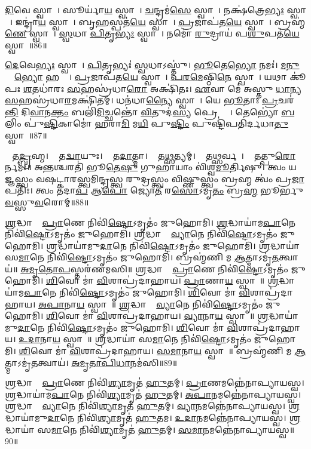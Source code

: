 \ul{𑌦𑌿}𑌵𑍇 𑌸𑍍𑌵𑌾𑌹𑌾᳚। 
𑌸𑍂𑌰𑍍𑌯𑌾॑\ul{𑌯} 𑌸𑍍𑌵𑌾𑌹𑌾᳚। 
\ul{𑌚}𑌨𑍍𑌦𑍍𑌰𑌮॑\ul{𑌸𑍇} 𑌸𑍍𑌵𑌾𑌹𑌾᳚। 
𑌨𑌕𑍍𑌷॑𑌤𑍍𑌰𑍇\ul{𑌭𑍍𑌯𑌃} 𑌸𑍍𑌵𑌾𑌹𑌾᳚। 
𑌇𑌨𑍍𑌦𑍍𑌰𑌾॑\ul{𑌯} 𑌸𑍍𑌵𑌾𑌹𑌾᳚। 
𑌬𑍃\ul{𑌹}𑌸𑍍𑌪𑌤॑\ul{𑌯𑍇} 𑌸𑍍𑌵𑌾𑌹𑌾᳚। 
\ul{𑌪𑍍𑌰}𑌜𑌾𑌪॑𑌤\ul{𑌯𑍇} 𑌸𑍍𑌵𑌾𑌹𑌾᳚। 
𑌬𑍍𑌰𑌹𑍍𑌮॑\ul{𑌣𑍇} 𑌸𑍍𑌵𑌾𑌹𑌾᳚। 
\ul{𑌸𑍍𑌵}𑌧𑌾 \ul{𑌪𑌿}𑌤𑍃\ul{𑌭𑍍𑌯𑌃} 𑌸𑍍𑌵𑌾𑌹𑌾᳚। 
𑌨𑌮𑍋॑ \ul{𑌰𑍁}𑌦𑍍𑌰𑌾𑌯॑ 𑌪\ul{𑌶𑍁}𑌪𑌤॑\ul{𑌯𑍇} 𑌸𑍍𑌵𑌾𑌹𑌾᳚॥86॥

\ul{𑌦𑍇}𑌵𑍇\ul{𑌭𑍍𑌯𑌃} 𑌸𑍍𑌵𑌾𑌹𑌾᳚। 
\ul{𑌪𑌿}𑌤𑍃𑌭𑍍𑌯𑌃॑ \ul{𑌸𑍍𑌵}𑌧𑌾𑌽𑌸𑍍𑌤𑍁॑। 
\ul{𑌭𑍂}𑌤𑍇\ul{𑌭𑍍𑌯𑍋} 𑌨𑌮𑌃॑। 
\ul{𑌮}\ul{𑌨𑍁}𑌷𑍍𑌯𑍇᳚\ul{𑌭𑍍𑌯𑍋} 𑌹𑌨𑍍𑌤𑌾᳚। 
\ul{𑌪𑍍𑌰}𑌜𑌾𑌪॑𑌤\ul{𑌯𑍇} 𑌸𑍍𑌵𑌾𑌹𑌾᳚। 
\ul{𑌪}\ul{𑌰}\ul{𑌮𑍇}𑌷𑍍𑌠𑌿\ul{𑌨𑍇} 𑌸𑍍𑌵𑌾𑌹𑌾᳚। 
𑌯𑌥𑌾 𑌕𑍂॑𑌪𑌃 \ul{𑌶}𑌤𑌧𑌾॑𑌰𑌃 \ul{𑌸}𑌹𑌸𑍍𑌰॑𑌧𑌾\ul{𑌰𑍋} 𑌅𑌕𑍍𑌷𑌿॑𑌤𑌃। 
\ul{𑌏}𑌵𑌾 𑌮𑍇॑ 𑌅𑌸𑍍𑌤𑍁 \ul{𑌧𑌾}𑌨𑍍𑌯 \ul{𑌸}𑌹𑌸𑍍𑌰॑𑌧𑌾\ul{𑌰}𑌮𑌕𑍍𑌷𑌿॑𑌤𑌮𑍍। 
𑌧𑌨॑𑌧𑌾\ul{𑌨𑍍𑌯𑍈} 𑌸𑍍𑌵𑌾𑌹𑌾᳚। 
𑌯𑍇 \ul{𑌭𑍂}𑌤𑌾𑌃 \ul{𑌪𑍍𑌰}𑌚𑌰॑\ul{𑌨𑍍𑌤𑌿} 𑌦𑌿\ul{𑌵𑌾}𑌨\ul{𑌕𑍍𑌤𑌂} 𑌬𑌲𑌿॑\ul{𑌮𑌿}𑌚𑍍𑌛𑌨𑍍𑌤𑍋॑ \ul{𑌵𑌿}𑌤𑍁𑌦॑\ul{𑌸𑍍𑌯} 𑌪𑍍𑌰𑍇𑌷𑍍𑌯𑌾𑌃᳚। 
𑌤𑍇𑌭𑍍𑌯𑍋॑ \ul{𑌬}𑌲𑌿𑌂 𑌪𑍁॑\ul{𑌷𑍍𑌟𑌿}𑌕𑌾𑌮𑍋॑ 𑌹𑌰𑌾\ul{𑌮𑌿} 𑌮\ul{𑌯𑌿} 𑌪𑍁\ul{𑌷𑍍𑌟𑌿𑌂} 𑌪𑍁𑌷𑍍𑌟𑌿॑𑌪𑌤𑌿𑌰𑍍𑌦𑌧𑌾\ul{𑌤𑍁} 𑌸𑍍𑌵𑌾𑌹𑌾᳚॥87॥ 
\anuvakamend

𑌓𑌂᳚ 𑌤\ul{𑌦𑍍𑌬𑍍𑌰}𑌹𑍍𑌮। 
𑌓𑌂᳚ 𑌤\ul{𑌦𑍍𑌵𑌾}𑌯𑍁𑌃। 
𑌓𑌂᳚ 𑌤\ul{𑌦𑌾}𑌤𑍍𑌮𑌾। 
𑌓𑌂᳚ 𑌤\ul{𑌥𑍍𑌸}𑌤𑍍𑌯𑌮𑍍‌।
𑌓𑌂᳚ 𑌤𑌥𑍍𑌸𑌰𑍍𑌵𑌮𑍍᳚‌। 
𑌓𑌂᳚ 𑌤𑌤𑍍𑌪𑍁\ul{𑌰𑍋}𑌰𑍍𑌨𑌮𑌃॥
𑌅𑌨𑍍𑌤𑌶𑍍𑌚𑌰𑌤𑌿॑ 𑌭𑍂\ul{𑌤𑍇}\ul{𑌷𑍁} 𑌗𑍁𑌹𑌾𑌯𑌾𑌂 𑌵𑌿॑𑌶𑍍𑌵\ul{𑌮𑍂}𑌰𑍍𑌤𑌿𑌷𑍁। 
𑌤𑍍𑌵𑌂 𑌯𑌜𑍍𑌞𑌸𑍍𑌤𑍍𑌵𑌂 𑌵𑌷𑌟𑍍𑌕𑌾𑌰𑌸𑍍𑌤𑍍𑌵𑌮𑌿𑌨𑍍𑌦𑍍𑌰𑌸𑍍𑌤𑍍𑌵 𑌰𑍁𑌦𑍍𑌰𑌸𑍍𑌤𑍍𑌵𑌂 𑌵𑌿𑌷𑍍𑌣𑍁𑌸𑍍𑌤𑍍𑌵𑌂 𑌬𑍍𑌰𑌹𑍍𑌮 𑌤𑍍𑌵𑌂॑ 𑌪𑍍𑌰\ul{𑌜𑌾}𑌪𑌤𑌿𑌃।
𑌤𑍍𑌵𑌂 𑌤॑𑌦𑌾\ul{𑌪} 𑌆\ul{𑌪𑍋} 𑌜𑍍𑌯𑍋\ul{𑌤𑍀} 𑌰\ul{𑌸𑍋}𑌽𑌮𑍃\ul{𑌤𑌂} 𑌬𑍍𑌰\ul{𑌹𑍍𑌮} 𑌭𑍂𑌰𑍍𑌭𑍁\ul{𑌵}𑌸𑍍𑌸𑍁\ul{𑌵}𑌰𑍋𑌮𑍍‌॥88॥
\anuvakamend

\ul{𑌶𑍍𑌰}𑌦𑍍𑌧𑌾𑌯𑌾𑌂᳚ \ul{𑌪𑍍𑌰𑌾}𑌣𑍇 𑌨𑌿𑌵𑌿॑\ul{𑌷𑍍𑌟𑍋}𑌽𑌮𑍃𑌤𑌂॑ 𑌜𑍁𑌹𑍋𑌮𑌿। 
\ul{𑌶𑍍𑌰}𑌦𑍍𑌧𑌾𑌯𑌾॑𑌮\ul{𑌪𑌾}𑌨𑍇 𑌨𑌿𑌵𑌿॑\ul{𑌷𑍍𑌟𑍋}𑌽𑌮𑍃𑌤𑌂॑ 𑌜𑍁𑌹𑍋𑌮𑌿। 
\ul{𑌶𑍍𑌰}𑌦𑍍𑌧𑌾𑌯𑌾𑌂᳚ \ul{𑌵𑍍𑌯𑌾}𑌨𑍇 𑌨𑌿𑌵𑌿॑\ul{𑌷𑍍𑌟𑍋}𑌽𑌮𑍃𑌤𑌂॑ 𑌜𑍁𑌹𑍋𑌮𑌿। 
\ul{𑌶𑍍𑌰}𑌦𑍍𑌧𑌾𑌯𑌾॑𑌮𑍁\ul{𑌦𑌾}𑌨𑍇 𑌨𑌿𑌵𑌿॑\ul{𑌷𑍍𑌟𑍋}𑌽𑌮𑍃𑌤𑌂॑ 𑌜𑍁𑌹𑍋𑌮𑌿। 
\ul{𑌶𑍍𑌰}𑌦𑍍𑌧𑌾𑌯𑌾॑ 𑌸\ul{𑌮𑌾}𑌨𑍇 𑌨𑌿𑌵𑌿॑\ul{𑌷𑍍𑌟𑍋}𑌽𑌮𑍃𑌤𑌂॑ 𑌜𑍁𑌹𑍋𑌮𑌿। 
𑌬𑍍𑌰𑌹𑍍𑌮॑𑌣𑌿 𑌮 \ul{𑌆}𑌤𑍍𑌮𑌾𑌽𑌮𑍃॑\ul{𑌤}𑌤𑍍𑌵𑌾𑌯॑॥ 
\ul{𑌅}\ul{𑌮𑍃}\ul{𑌤𑍋}\ul{𑌪}𑌸𑍍𑌤𑌰॑𑌣𑌮𑌸𑌿॥ 
\ul{𑌶𑍍𑌰}𑌦𑍍𑌧𑌾𑌯𑌾𑌂᳚ \ul{𑌪𑍍𑌰𑌾}𑌣𑍇 𑌨𑌿𑌵𑌿॑\ul{𑌷𑍍𑌟𑍋}𑌽𑌮𑍃𑌤𑌂॑ 𑌜𑍁𑌹𑍋𑌮𑌿। 
\ul{𑌶𑌿}𑌵𑍋 𑌮𑌾॑ \ul{𑌵𑌿}𑌶𑌾𑌪𑍍𑌰॑𑌦𑌾𑌹𑌾𑌯। 
\ul{𑌪𑍍𑌰𑌾}𑌣𑌾\ul{𑌯} 𑌸𑍍𑌵𑌾𑌹𑌾᳚॥ 
\ul{𑌶𑍍𑌰}𑌦𑍍𑌧𑌾𑌯𑌾॑𑌮\ul{𑌪𑌾}𑌨𑍇 𑌨𑌿𑌵𑌿॑\ul{𑌷𑍍𑌟𑍋}𑌽𑌮𑍃𑌤𑌂॑ 𑌜𑍁𑌹𑍋𑌮𑌿। 
\ul{𑌶𑌿}𑌵𑍋 𑌮𑌾॑ \ul{𑌵𑌿}𑌶𑌾𑌪𑍍𑌰॑𑌦𑌾𑌹𑌾𑌯। 
\ul{𑌅}\ul{𑌪𑌾}𑌨𑌾\ul{𑌯} 𑌸𑍍𑌵𑌾𑌹𑌾᳚॥ 
\ul{𑌶𑍍𑌰}𑌦𑍍𑌧𑌾𑌯𑌾𑌂᳚ \ul{𑌵𑍍𑌯𑌾}𑌨𑍇 𑌨𑌿𑌵𑌿॑\ul{𑌷𑍍𑌟𑍋}𑌽𑌮𑍃𑌤𑌂॑ 𑌜𑍁𑌹𑍋𑌮𑌿। 
\ul{𑌶𑌿}𑌵𑍋 𑌮𑌾॑ \ul{𑌵𑌿}𑌶𑌾𑌪𑍍𑌰॑𑌦𑌾𑌹𑌾𑌯। 
\ul{𑌵𑍍𑌯𑌾}𑌨𑌾\ul{𑌯} 𑌸𑍍𑌵𑌾𑌹𑌾᳚॥ 
\ul{𑌶𑍍𑌰}𑌦𑍍𑌧𑌾𑌯𑌾॑𑌮𑍁\ul{𑌦𑌾}𑌨𑍇 𑌨𑌿𑌵𑌿॑\ul{𑌷𑍍𑌟𑍋}𑌽𑌮𑍃𑌤𑌂॑ 𑌜𑍁𑌹𑍋𑌮𑌿। 
\ul{𑌶𑌿}𑌵𑍋 𑌮𑌾॑ \ul{𑌵𑌿}𑌶𑌾𑌪𑍍𑌰॑𑌦𑌾𑌹𑌾𑌯। 
\ul{𑌉}\ul{𑌦𑌾}𑌨𑌾\ul{𑌯} 𑌸𑍍𑌵𑌾𑌹𑌾᳚॥ 
\ul{𑌶𑍍𑌰}𑌦𑍍𑌧𑌾𑌯𑌾॑ 𑌸\ul{𑌮𑌾}𑌨𑍇 𑌨𑌿𑌵𑌿॑\ul{𑌷𑍍𑌟𑍋}𑌽𑌮𑍃𑌤𑌂॑ 𑌜𑍁𑌹𑍋𑌮𑌿। 
\ul{𑌶𑌿}𑌵𑍋 𑌮𑌾॑ \ul{𑌵𑌿}𑌶𑌾𑌪𑍍𑌰॑𑌦𑌾𑌹𑌾𑌯। 
\ul{𑌸}\ul{𑌮𑌾}𑌨𑌾\ul{𑌯} 𑌸𑍍𑌵𑌾𑌹𑌾᳚॥ 
𑌬𑍍𑌰𑌹𑍍𑌮॑𑌣𑌿 𑌮 \ul{𑌆}𑌤𑍍𑌮𑌾𑌽𑌮𑍃॑\ul{𑌤}𑌤𑍍𑌵𑌾𑌯॑। 
\ul{𑌅}\ul{𑌮𑍃}\ul{𑌤𑌾}\ul{𑌪𑌿}\ul{𑌧𑌾}𑌨𑌮॑𑌸𑌿॥89॥
 \anuvakamend


\ul{𑌶𑍍𑌰}𑌦𑍍𑌧𑌾𑌯𑌾𑌂᳚ \ul{𑌪𑍍𑌰𑌾}𑌣𑍇 𑌨𑌿𑌵𑌿॑\ul{𑌶𑍍𑌯𑌾}𑌮𑍃𑌤॑ \ul{𑌹𑍁}𑌤𑌮𑍍। 
\ul{𑌪𑍍𑌰𑌾}𑌣𑌮𑌨𑍍𑌨𑍇॑𑌨𑌾𑌪𑍍𑌯𑌾𑌯𑌸𑍍𑌵। 
\ul{𑌶𑍍𑌰}𑌦𑍍𑌧𑌾𑌯𑌾॑𑌮\ul{𑌪𑌾}𑌨𑍇 𑌨𑌿𑌵𑌿॑\ul{𑌶𑍍𑌯𑌾}𑌮𑍃𑌤॑ \ul{𑌹𑍁}𑌤𑌮𑍍। 
\ul{𑌅}\ul{𑌪𑌾}𑌨𑌮𑌨𑍍𑌨𑍇॑𑌨𑌾𑌪𑍍𑌯𑌾𑌯𑌸𑍍𑌵।
\ul{𑌶𑍍𑌰}𑌦𑍍𑌧𑌾𑌯𑌾𑌂᳚ \ul{𑌵𑍍𑌯𑌾}𑌨𑍇 𑌨𑌿𑌵𑌿॑\ul{𑌶𑍍𑌯𑌾}𑌮𑍃𑌤॑ \ul{𑌹𑍁}𑌤𑌮𑍍। 
\ul{𑌵𑍍𑌯𑌾}𑌨𑌮𑌨𑍍𑌨𑍇॑𑌨𑌾𑌪𑍍𑌯𑌾𑌯𑌸𑍍𑌵। 
\ul{𑌶𑍍𑌰}𑌦𑍍𑌧𑌾𑌯𑌾॑𑌮𑍁\ul{𑌦𑌾}𑌨𑍇 𑌨𑌿𑌵𑌿॑\ul{𑌶𑍍𑌯𑌾}𑌮𑍃𑌤॑ \ul{𑌹𑍁}𑌤𑌮। 
\ul{𑌉}\ul{𑌦𑌾}𑌨𑌮𑌨𑍍𑌨𑍇॑𑌨𑌾𑌪𑍍𑌯𑌾𑌯𑌸𑍍𑌵।
\ul{𑌶𑍍𑌰}𑌦𑍍𑌧𑌾𑌯𑌾॑ 𑌸\ul{𑌮𑌾}𑌨𑍇 𑌨𑌿𑌵𑌿॑\ul{𑌶𑍍𑌯𑌾}𑌮𑍃𑌤॑ \ul{𑌹𑍁}𑌤𑌮𑍍। 
\ul{𑌸}\ul{𑌮𑌾}𑌨𑌮𑌨𑍍𑌨𑍇॑𑌨𑌾𑌪𑍍𑌯𑌾\-𑌯𑌸𑍍𑌵॥90॥\anuvakamend

